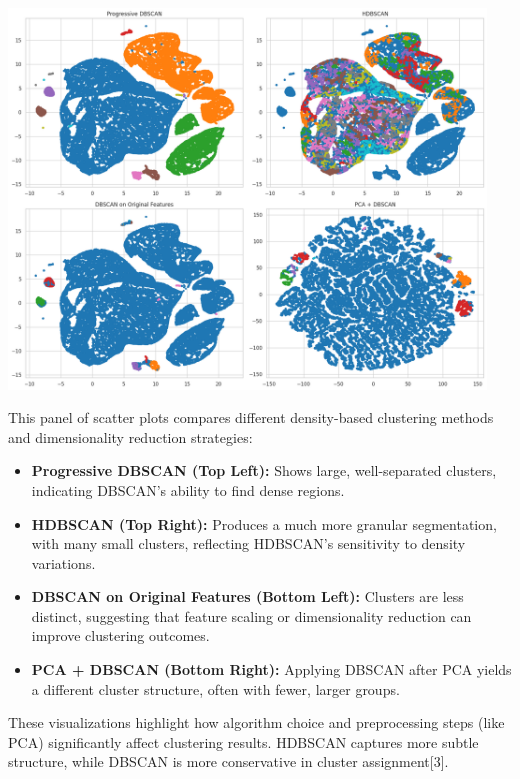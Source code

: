 \documentclass[a4paper]{article}
\begin{document}
\begin{multicols}{2}
\noindent
\begin{minipage}{\columnwidth}
\centering
\includegraphics[width=0.95\textwidth]{output.png}
\label{fig:clustering_methods}
\end{minipage}

This panel of scatter plots compares different density-based clustering methods and dimensionality reduction strategies:

\begin{itemize}
    \item \textbf{Progressive DBSCAN (Top Left):} Shows large, well-separated clusters, indicating DBSCAN’s ability to find dense regions.
    \item \textbf{HDBSCAN (Top Right):} Produces a much more granular segmentation, with many small clusters, reflecting HDBSCAN’s sensitivity to density variations.
    \item \textbf{DBSCAN on Original Features (Bottom Left):} Clusters are less distinct, suggesting that feature scaling or dimensionality reduction can improve clustering outcomes.
    \item \textbf{PCA + DBSCAN (Bottom Right):} Applying DBSCAN after PCA yields a different cluster structure, often with fewer, larger groups.
\end{itemize}

These visualizations highlight how algorithm choice and preprocessing steps (like PCA) significantly affect clustering results. HDBSCAN captures more subtle structure, while DBSCAN is more conservative in cluster assignment[3].


\end{multicols}
\end{document}
